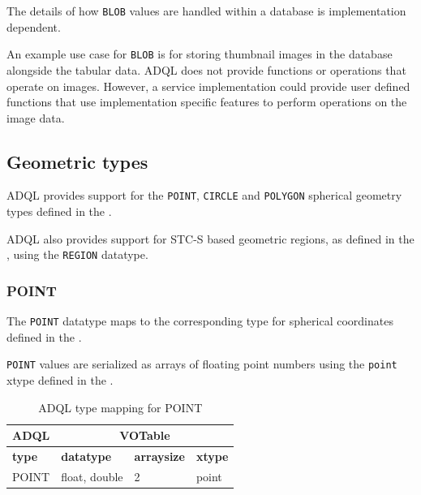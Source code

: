 \documentclass[11pt,a4paper]{ivoa}
\begin{document}
The details of how \verb:BLOB: values are handled within a
database is implementation dependent.

An example use case for \verb:BLOB: is for storing thumbnail images
in the database alongside the tabular data.
ADQL does not provide functions or operations that operate on
images.
However, a service implementation could provide user defined
functions that use implementation specific features to perform
operations on the image data.

\subsection{Geometric types}
\label{sec:types.geom}

ADQL provides support for the \verb:POINT:, \verb:CIRCLE: and \verb:POLYGON:
spherical geometry types defined in the \DALISpec{}.

ADQL also provides support for STC-S based geometric regions, as defined in the
\STCSAppendix{}, using the \verb:REGION: datatype.

\subsubsection{POINT}
\label{sec:types.geom.point}

The \verb:POINT: datatype maps to the corresponding type
for spherical coordinates defined in the
\DALISpec{}.

\verb:POINT: values are serialized as arrays of floating point numbers
using the \verb:point: xtype defined in the \DALISpec{}.

\begin{table}[h]\footnotesize
    \begin{tabular}
        {|p{}|p{}|p{}|p{}|}

        \hline
        \multicolumn{1}{|c|}{\textbf{ADQL}} &
        \multicolumn{3}{|c|}{\textbf{VOTable}}
        \tabularnewline

        \hline
        \textbf{type} &
        \textbf{datatype} &
        \textbf{arraysize} &
        \textbf{xtype}
        \tabularnewline

        \hline
        POINT &
        float, double &
        2 &
        point
        \tabularnewline
        \hline
    \end{tabular}
    \caption{ADQL type mapping for POINT}
    \label{table:types.geom.point}
\end{table}
\end{document}
